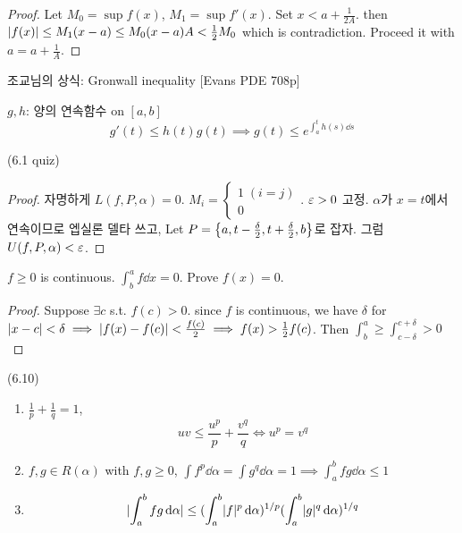 \documentclass{article}
\begin{document}
\begin{proof}
    Let $M_0=\sup {f(x)}$, $M_1=\sup {f'(x)}$. Set $x < a + \frac{1}{2A}$. then $\lvert f(x)\rvert \leq M_1(x-a) \leq M_0 (x-a) A < \frac{1}{2}M_0$ which is contradiction. Proceed it with $a=a+\frac{1}{A}$.
\end{proof}

조교님의 상식: Gronwall inequality [Evans PDE 708p]

\begin{theorem}
    $g,h$: 양의 연속함수 on $[a,b]$
    \[g'(t)\leq h(t)g(t) \implies g(t)\leq e^{\int^t_a h(s)\dd s}\]
\end{theorem}

\begin{proposition}
    (6.1 quiz)
\end{proposition}

\begin{proof}
    자명하게 $L(f,P,\alpha)=0$. $M_i = \begin{cases} 1 \; (i=j) \\ 0 \end{cases}$. $\varepsilon > 0$ 고정. $\alpha$가 $x=t$에서 연속이므로 엡실론 델타 쓰고, Let $P=\left\{ a,t-\frac{\delta}{2}, t+\frac{\delta}{2}, b \right\}$로 잡자. 그럼 $U(f,P,\alpha)<\varepsilon$.
\end{proof}

\begin{proposition}
    $f\geq 0$ is continuous. $\int^a_b f \dd x = 0$. Prove $f(x)=0$.
    \label{problem:singlepoint}
\end{proposition}

\begin{proof}
    Suppose $\exists c$ s.t. $f(c) > 0$. since $f$ is continuous, we have $\delta$ for $\lvert x-c\rvert < \delta \implies \lvert f(x)-f(c)\rvert < \frac{f(c)}{2} \implies f(x) > \frac{1}{2}f(c)$. Then $\int^a_b \geq \int^{c+\delta}_{c-\delta} > 0$
\end{proof}

\begin{proposition}
    (6.10)
    \begin{enumerate}
        \item $\frac{1}{p}+\frac{1}{q}=1$, \[uv \leq \frac{u^p}{p} + \frac{v^q}{q} \iff u^p = v^q \]
        \item $f,g \in R(\alpha)$ with $f,g \geq 0$, $\int f^p \dd \alpha = \int g^q \dd \alpha = 1 \implies \int^b_a fg \dd \alpha \leq 1$
        \item \[\lvert\int^b_a fg \,\mathrm{d} \alpha\rvert \leq (\int^b_a \lvert f\rvert^p \,\mathrm{d}\alpha)^{1/p}(\int^b_a \lvert g\rvert^q \,\mathrm{d}\alpha)^{1/q}\]
    \end{enumerate}
\end{proposition}
\end{document}
